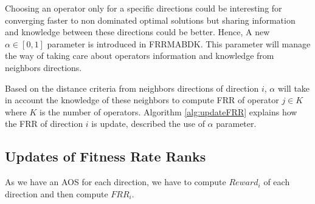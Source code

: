\documentclass{article}
\begin{document}
    \vspace{3mm}

    Choosing an operator only for a specific directions could be interesting for converging faster to non dominated optimal solutions but sharing information and knowledge between these directions could be better. Hence, A new $\alpha \in [0, 1]$ parameter is introduced in FRRMABDK. This parameter will manage the way of taking care about operators information and knowledge from neighbors directions.

    \vspace{3mm}

    Based on the distance criteria from neighbors directions of direction $i$, $\alpha$ will take in account the knowledge of these neighbors to compute FRR of operator $j \in K$ where $K$ is the number of operators. Algorithm \ref{alg:updateFRR} explains how the FRR of direction $i$ is update, described the use of $\alpha$ parameter.


    \subsection{Updates of Fitness Rate Ranks}

    As we have an AOS for each direction, we have to compute $Reward_i$ of each direction and then compute $FRR_i$.

    \vspace{3mm}
\end{document}
